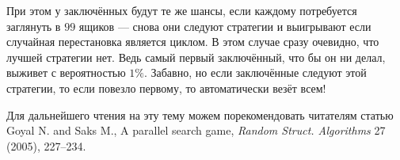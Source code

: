 При этом у заключённых будут те же шансы, если каждому потребуется заглянуть в $99$ ящиков --- снова они следуют стратегии и выигрывают если случайная перестановка является циклом.
В этом случае сразу очевидно, что лучшей стратегии нет.
Ведь самый первый заключённый, что бы он ни делал, выживет с вероятностью $1\%$.
Забавно, но если заключённые следуют этой стратегии, то если повезло первому, то автоматически везёт всем!

\begin{addedbytheeditors}
Для дальнейшего чтения на эту тему можем порекомендовать читателям статью Goyal N. and Saks M., A parallel search game,\textit{ Random Struct. Algorithms} 27 (2005), 227--234.
\pr
\end{addedbytheeditors}
